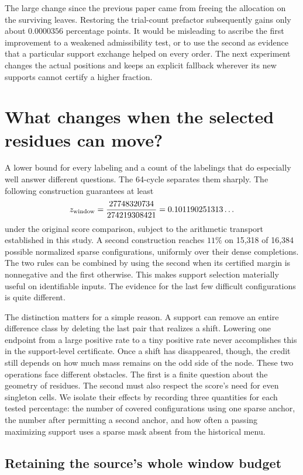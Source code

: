 \documentclass[12pt,letterpaper]{article}
\begin{document}
The large change since the previous paper came from freeing the allocation on the surviving leaves. Restoring the trial-count prefactor subsequently gains only about \(0.0000356\) percentage points. It would be misleading to ascribe the first improvement to a weakened admissibility test, or to use the second as evidence that a particular support exchange helped on every order. The next experiment changes the actual positions and keeps an explicit fallback wherever its new supports cannot certify a higher fraction.
\section{What changes when the selected residues can move?}
\label{sec:lower-support}

A lower bound for every labeling and a count of the labelings that do especially well answer different questions. The 64-cycle separates them sharply. The following construction guarantees at least
\[
             z_{\rm window}=\frac{27748320734}{274219308421}
                      =0.101190251313\ldots
\]
under the original score comparison, subject to the arithmetic transport established in this study. A second construction reaches \(11\%\) on 15,318 of 16,384 possible normalized sparse configurations, uniformly over their dense completions. The two rules can be combined by using the second when its certified margin is nonnegative and the first otherwise. This makes support selection materially useful on identifiable inputs. The evidence for the last few difficult configurations is quite different.

The distinction matters for a simple reason. A support can remove an entire difference class by deleting the last pair that realizes a shift. Lowering one endpoint from a large positive rate to a tiny positive rate never accomplishes this in the support-level certificate. Once a shift has disappeared, though, the credit still depends on how much mass remains on the odd side of the node. These two operations face different obstacles. The first is a finite question about the geometry of residues. The second must also respect the score's need for even singleton cells. We isolate their effects by recording three quantities for each tested percentage: the number of covered configurations using one sparse anchor, the number after permitting a second anchor, and how often a passing maximizing support uses a sparse mask absent from the historical menu.

\subsection{Retaining the source's whole window budget}
\end{document}
